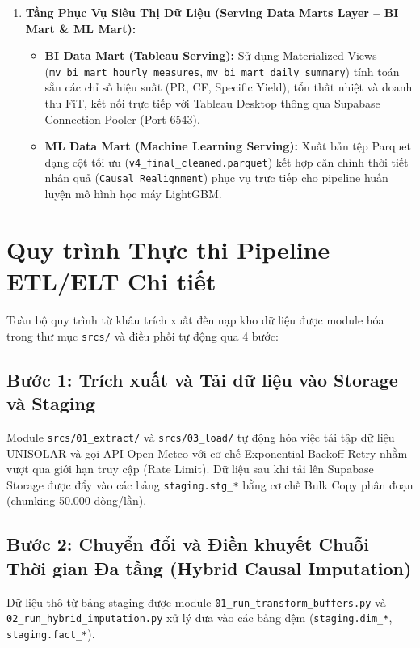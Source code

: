 \documentclass[12pt, a4paper]{report}
\begin{document}
\begin{enumerate}[label=\textbf{Layer \arabic*:}, leftmargin=*]
    \item \textbf{Tầng Phục Vụ Siêu Thị Dữ Liệu (Serving Data Marts Layer -- BI Mart \& ML Mart):}
    \begin{itemize}[noitemsep]
        \item \textbf{BI Data Mart (Tableau Serving):} Sử dụng Materialized Views (\texttt{mv\_bi\_mart\_hourly\_measures}, \texttt{mv\_bi\_mart\_daily\_summary}) tính toán sẵn các chỉ số hiệu suất (PR, CF, Specific Yield), tổn thất nhiệt và doanh thu FiT, kết nối trực tiếp với Tableau Desktop thông qua Supabase Connection Pooler (Port 6543).
        \item \textbf{ML Data Mart (Machine Learning Serving):} Xuất bản tệp Parquet dạng cột tối ưu (\texttt{v4\_final\_cleaned.parquet}) kết hợp căn chỉnh thời tiết nhân quả (\texttt{Causal Realignment}) phục vụ trực tiếp cho pipeline huấn luyện mô hình học máy LightGBM.
    \end{itemize}
\end{enumerate}

\section{Quy trình Thực thi Pipeline ETL/ELT Chi tiết}
\label{sec:etl_pipeline_steps}

Toàn bộ quy trình từ khâu trích xuất đến nạp kho dữ liệu được module hóa trong thư mục \texttt{srcs/} và điều phối tự động qua 4 bước:

\subsection{Bước 1: Trích xuất và Tải dữ liệu vào Storage và Staging}
Module \texttt{srcs/01\_extract/} và \texttt{srcs/03\_load/} tự động hóa việc tải tập dữ liệu UNISOLAR và gọi API Open-Meteo với cơ chế Exponential Backoff Retry nhằm vượt qua giới hạn truy cập (Rate Limit). Dữ liệu sau khi tải lên Supabase Storage được đẩy vào các bảng \texttt{staging.stg\_*} bằng cơ chế Bulk Copy phân đoạn (chunking 50.000 dòng/lần).

\subsection{Bước 2: Chuyển đổi và Điền khuyết Chuỗi Thời gian Đa tầng (Hybrid Causal Imputation)}
Dữ liệu thô từ bảng staging được module \texttt{01\_run\_transform\_buffers.py} và \texttt{02\_run\_hybrid\_imputation.py} xử lý đưa vào các bảng đệm (\texttt{staging.dim\_*}, \texttt{staging.fact\_*}). 
\end{document}

